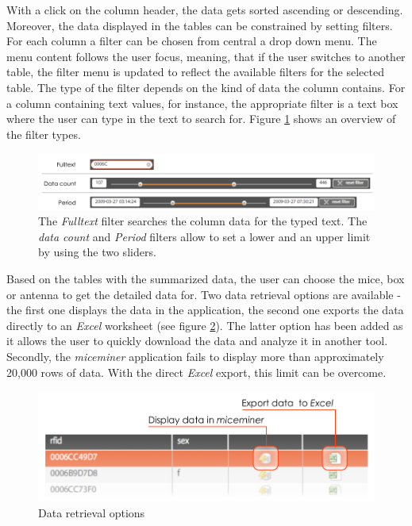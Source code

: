 With a click on the column header, the data gets sorted ascending or descending. Moreover, the data displayed in the tables can be constrained by setting filters. For each column a filter can be chosen from central a drop down menu. The menu content follows the user focus, meaning, that if the user switches to another table, the filter menu is updated to reflect the available filters for the selected table. The type of the filter depends on the kind of data the column contains. For a column containing text values, for instance, the appropriate filter is a text box where the user can type in the text to search for. Figure \ref{fig:filter_types} shows an overview of the filter types.

\begin{figure}[ht]
\begin{center}
  \includegraphics[width=\textwidth]{assets/pdf/filter_types.pdf}
  \caption[Filter types]{The \textit{Fulltext} filter searches the column data for the typed text. The \textit{data count} and \textit{Period} filters allow to set a lower and an upper limit by using the two sliders.}
  \label{fig:filter_types}
\end{center}
\end{figure}

Based on the tables with the summarized data, the user can choose the mice, box or antenna to get the detailed data for. Two data retrieval options are available - the first one displays the data in the application, the second one exports the data directly to an \textit{Excel} worksheet (see figure \ref{fig:get_data_options}). The latter option has been added as it allows the user to quickly download the data and analyze it in another tool. Secondly, the \textit{miceminer} application fails to display more than approximately 20,000 rows of data. With the direct \textit{Excel} export, this limit can be overcome.   

\begin{figure}[htbp]
\begin{center}
  \includegraphics[width=.75\textwidth]{assets/pdf/get_data_options.pdf}
  \caption{Data retrieval options}
  \label{fig:get_data_options}
\end{center}
\end{figure}

